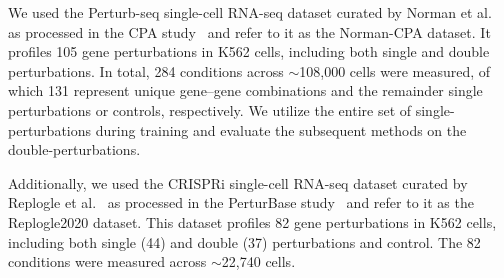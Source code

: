 We used the Perturb-seq single-cell RNA-seq dataset curated by Norman et al.~\cite{norman2019exploring} as processed in the CPA study~\cite{lotfollahi_predicting_2023} and refer to it as the Norman-CPA dataset.
It profiles 105 gene perturbations in K562 cells, including both single and double perturbations.
In total, 284 conditions across $\sim$108{,}000 cells were measured, of which 131 represent unique gene--gene combinations and the remainder single perturbations or controls, respectively.
We utilize the entire set of single-perturbations during training and evaluate the subsequent methods on the double-perturbations.

Additionally, we used the CRISPRi single-cell RNA-seq dataset curated by Replogle et al.~\cite{replogle_combinatorial_2020} as processed in the PerturBase study~\cite{wei_perturbase_2024} and refer to it as the Replogle2020 dataset.
This dataset profiles 82 gene perturbations in K562 cells, including both single (44) and double (37) perturbations and control.
The 82 conditions were measured across $\sim$22{,}740 cells.

